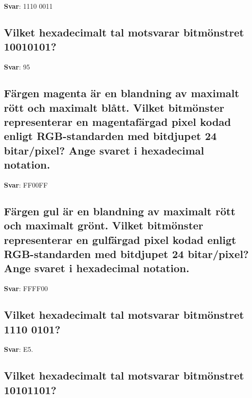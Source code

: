 \documentclass[a4paper,11pt,oneside]{article}
\begin{document}
\begin{sloppypar}
\label{q:423:sa:sv:True}

\textbf{Svar}: 1110 0011



\subsection{Vilket hexadecimalt tal motsvarar bitm\"onstret 10010101?}

\label{q:424:sa:sv:True}

\textbf{Svar}: 95



\subsection{F\"argen magenta \"ar en blandning av maximalt r\"ott och maximalt bl\r{a}tt. Vilket bitm\"onster representerar en magentaf\"argad pixel kodad enligt RGB-standarden med bitdjupet 24 bitar/pixel? Ange svaret i hexadecimal notation.}

\label{q:425:sa:sv:True}

\textbf{Svar}: FF00FF



\subsection{F\"argen gul \"ar en blandning av maximalt r\"ott och maximalt gr\"ont. Vilket bitm\"onster representerar en gulf\"argad pixel kodad enligt RGB-standarden med bitdjupet 24 bitar/pixel? Ange svaret i hexadecimal notation.}

\label{q:426:sa:sv:True}

\textbf{Svar}: FFFF00



\subsection{Vilket hexadecimalt tal motsvarar bitm\"onstret 1110 0101?}

\label{q:427:sa:sv:True}

\textbf{Svar}: E5.



\subsection{Vilket hexadecimalt tal motsvarar bitm\"onstret 10101101?}

\label{q:428:sa:sv:True}


\end{sloppypar}
\end{document}
